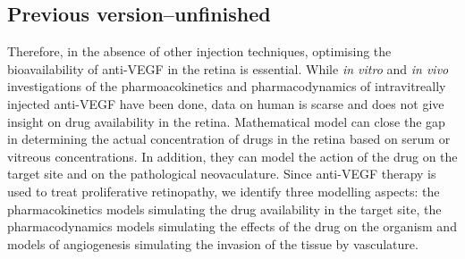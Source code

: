 \documentclass[11pt,a4paper, twocolumn]{article}
\begin{document}

\subsection{Previous version--unfinished}

Therefore, in the absence of other injection techniques, optimising the bioavailability of anti-VEGF in the retina is essential.
While \textit{in vitro} and \textit{in vivo} investigations of the pharmoacokinetics and pharmacodynamics of intravitreally injected anti-VEGF have been done, data on human is scarse and does not give insight on drug availability in the retina.
Mathematical model can close the gap in determining the actual concentration of drugs in the retina based on serum or vitreous concentrations.
In addition, they can model the action of the drug on the target site and on the pathological neovaculature.
Since anti-VEGF therapy is used to treat proliferative retinopathy, we identify three modelling aspects: the pharmacokinetics models simulating the drug availability in the target site, the pharmacodynamics models simulating the effects of the drug on the organism and models of angiogenesis simulating the invasion of the tissue by vasculature.
\end{document}
